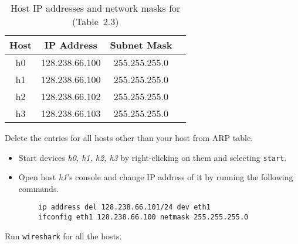 \documentclass{UTNetLab}
\begin{document}
    \begin{table}[H]
        \caption{Host IP addresses and network masks for  (Table~2.3)}\label{tab:2.3}
        \centering
        \begin{tabular}{ c c c c }
            \hline \hline
            Host & IP Address & Subnet Mask \\
            \hline 
            h0 & 128.238.66.100 & 255.255.255.0 \\
            h1 & 128.238.66.100 & 255.255.255.0 \\
            h2 & 128.238.66.102 & 255.255.255.0 \\
            h3 & 128.238.66.103 & 255.255.255.0 \\
            \hline \hline
            \end{tabular}
    \end{table}
Delete the entries for all hosts other than your host from ARP table.
\begin{itemize}
	\item Start devices \textit{h0, h1, h2, h3} by right-clicking on them and selecting \texttt{start}.
	\item Open host \textit{h1}'s console and change IP address of it by running the following commands.
\end{itemize}
        \begin{lstlisting}
        ip address del 128.238.66.101/24 dev eth1
        ifconfig eth1 128.238.66.100 netmask 255.255.255.0       
    \end{lstlisting}

Run \lstinline{wireshark} for all the hosts. 
\end{document}
